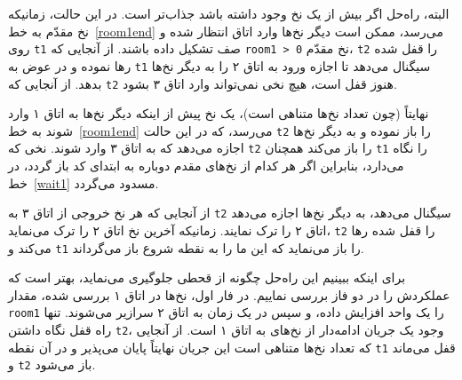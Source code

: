 \documentclass{book}
\begin{document}
    البته، راه‌حل اگر بیش از یک نخ وجود داشته باشد جذاب‌تر است. در این حالت، زمانیکه نخ مقدّم به خط~\ref{room1end} می‌رسد، ممکن است دیگر نخ‌ها 
    وارد اتاق انتظار شده  و روی  {\tt t1} صف تشکیل داده باشند. از آنجایی که {\tt room1 > 0} نخ مقدّم، {\tt t2} را قفل شده رها نموده و در عوض 
    به {\tt t1} سیگنال می‌دهد تا اجازه ورود به اتاق ۲ را به دیگر نخ‌ها بدهد. از آنجایی که {\tt t2} هنوز قفل است، هیچ نخی نمی‌تواند وارد اتاق ۳ بشود. 

    نهایتاً (چون تعداد نخ‌ها متناهی است)، یک نخ پیش از اینکه دیگر نخ‌ها به اتاق ۱ وارد شوند به خط~\ref{room1end} می‌رسد، که در این حالت {\tt t2}
    را باز نموده و به دیگر نخ‌ها اجازه می‌دهد که به اتاق ۳ وارد شوند. نخی که  {\tt t2}  را باز می‌کند همچنان  {\tt t1} را نگاه می‌دارد، بنابراین 
    اگر هر کدام از نخ‌های مقدم دوباره به ابتدای کد باز گردد، در خط~\ref{wait1} مسدود می‌گردد. 

    از آنجایی که هر نخ خروجی از اتاق ۳ به  {\tt t2} سیگنال می‌دهد،  به دیگر نخ‌ها اجازه می‌دهد اتاق ۲ را ترک نمایند. 
    زمانیکه آخرین نخ اتاق ۲ را ترک می‌نماید، {\tt t2}  را قفل شده رها می‌کند و  {\tt t1} را باز می‌نماید که این ما را به نقطه شروع باز می‌گرداند. 


    برای اینکه ببینیم این راه‌حل چگونه از قحطی جلوگیری می‌نماید، بهتر است که عملکردش را در دو فاز بررسی نماییم. 
    در فار اول، نخ‌ها در اتاق ۱ بررسی شده، مقدار {\tt room1} را یک واحد افزایش داده، و سپس در یک زمان به اتاق ۲ سرازیر می‌شوند. 
    تنها راه قفل نگاه داشتن  {\tt t2}، وجود یک جریان ادامه‌دار از نخ‌های به اتاق ۱ است. 
    از آنجایی که تعداد نخ‌ها متناهی است این جریان نهایتاً پایان می‌پذیر و در آن نقطه {\tt t1} قفل می‌ماند و  {\tt t2} باز می‌شود. 
    
\end{document}
